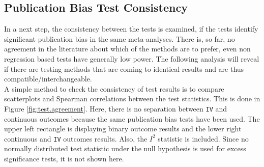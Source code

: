 \documentclass[11pt,a4paper,twoside]{book}\usepackage[]{graphicx}\usepackage[]{color}
\begin{document}
\subsection{Publication Bias Test Consistency}
In a next step, the consistency between the tests is examined, \eg if the tests identify significant publication bias in the same meta-analyses. There is, so far, no agreement in the literature about which of the methods are to prefer, even non regression based tests have generally low power. The following analysis will reveal if there are \eg testing methods that are coming to identical results and are thus compatible/interchangeable. \\
A simple method to check the consistency of test results is to compare scatterplots and Spearman correlations between the test statistics. This is done in Figure \ref{fig:test.agreement}. Here, there is no separation between \texttt{IV} and continuous outcomes because the same publication bias tests have been used. The upper left rectangle is displaying binary outcome results and the lower right continuous and \texttt{IV} outcomes results. Also, the $I^2$ statistic is included. Since no normally distributed test statistic under the null hypothesis is used for excess significance tests, it is not shown here.
\end{document}
